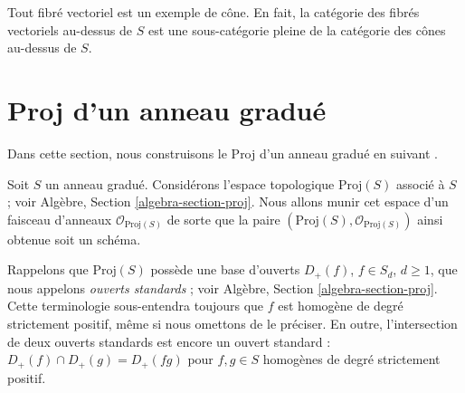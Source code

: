 \noindent
Tout fibré vectoriel est un exemple de cône. En fait, la catégorie des
fibrés vectoriels au-dessus de $S$ est une sous-catégorie pleine de la
catégorie des cônes au-dessus de $S$.

\section{Proj d'un anneau gradué}
\label{section-proj}

\noindent
Dans cette section, nous construisons le Proj d'un anneau gradué
en suivant \cite[II, Section 2]{EGA}.

\medskip\noindent
Soit $S$ un anneau gradué. Considérons l'espace topologique $\text{Proj}(S)$
associé à $S$ ; voir Algèbre, Section \ref{algebra-section-proj}.
Nous allons munir cet espace d'un faisceau d'anneaux $\mathcal{O}_{\text{Proj}(S)}$
de sorte que la paire $(\text{Proj}(S), \mathcal{O}_{\text{Proj}(S)})$
ainsi obtenue soit un schéma.

\medskip\noindent
Rappelons que $\text{Proj}(S)$ possède une base d'ouverts $D_{+}(f)$,
$f \in S_d$, $d \geq 1$, que nous appelons {\it ouverts standards} ; voir
Algèbre, Section \ref{algebra-section-proj}. Cette terminologie sous-entendra
toujours que $f$ est homogène de degré strictement positif, même si nous
omettons de le préciser. En outre, l'intersection de deux ouverts standards
est encore un ouvert standard :
$D_{+}(f) \cap D_{+}(g) = D_{+}(fg)$ pour $f, g \in S$ homogènes de degré
strictement positif.

